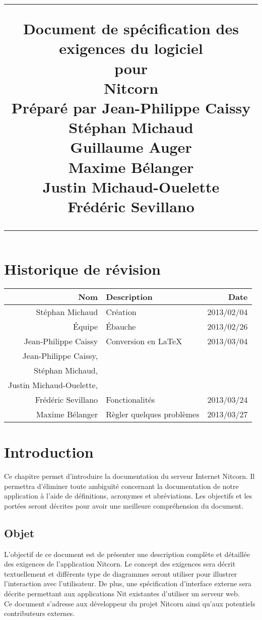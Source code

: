 \documentclass{scrreprt}
\title{%
\flushright
\rule{16cm}{5pt}\vskip1cm
\Huge{Document de spécification des exigences du logiciel}\\
\vspace{2cm}
pour\\
\vspace{2cm}
Nitcorn\\
\vspace{2cm}
Préparé par Jean-Philippe Caissy\\Stéphan Michaud\\Guillaume Auger\\Maxime
Bélanger\\Justin Michaud-Ouelette\\Frédéric Sevillano\\
\vfill
\rule{16cm}{5pt}
}
\date{}
\begin{document}
\maketitle
\tableofcontents
\chapter*{Historique de révision}
\begin{tabularx}{\textwidth}{|r|X|r|}
    \hline
    Nom & Description & Date \\
    \hline
    Stéphan Michaud & Création & 2013/02/04 \\
    \hline
    Équipe & Ébauche & 2013/02/26 \\
    \hline
    Jean-Philippe Caissy & Conversion en \LaTeX & 2013/03/04 \\
    \hline
    Jean-Philippe Caissy,\\Stéphan Michaud,\\Justin Michaud-Ouelette,\\Frédéric Sevillano & Fonctionalités & 2013/03/24 \\
    \hline
    Maxime Bélanger & Règler quelques problèmes & 2013/03/27
\end{tabularx}

\chapter{Introduction}
Ce chapitre permet d'introduire la documentation du serveur Internet Nitcorn. Il permettra d'éliminer toute ambiguïté concernant la documentation
de notre application à l'aide de définitions, acronymes et
abréviations. Les objectifs et les portées seront décrites pour
avoir une meilleure compréhension du document.
\section{Objet}
L'objectif de ce document est de présenter une description complète et
détaillée des exigences de l'application Nitcorn. Le concept des exigences sera décrit textuellement et différents type de diagrammes seront utiliser pour illustrer  l'interaction avec l'utilisateur. De plus, une spécification d'interface externe sera décrite permettant aux applications Nit existantes d'utiliser un serveur web.\\

Ce document s'adresse aux développeur du projet Nitcorn ainsi qu'aux potentiels
contributeurs externes.
\end{document}
